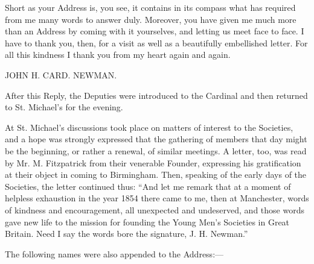 Short as your Address is, you see, it contains in its compass what
has required from me many words to answer duly. Moreover, you have
given me much more than an Address by coming with it yourselves, and
letting us meet face to face. I have to thank you, then, for a visit
as well as a beautifully embellished letter. For all this
kindness I thank you from my heart again and again.

JOHN H. CARD. NEWMAN.

After this Reply, the Deputies were introduced to the Cardinal and
then returned to St. Michael's for the evening.

At St. Michael's discussions took place on matters of interest to
the Societies, and a hope was strongly expressed that the gathering of
members that day might be the beginning, or rather a renewal, of
similar meetings. A letter, too, was read by Mr. M. Fitzpatrick from
their venerable Founder, expressing his gratification at their object
in coming to Birmingham. Then, speaking of the early days of the
Societies, the letter continued thus: ``And let me remark that at
a moment of helpless exhaustion in the year 1854 there came to me,
then at Manchester, words of kindness and encouragement, all
unexpected and undeserved, and those words gave new life to the
mission for founding the Young Men's Societies in Great Britain. Need
I say the words bore the signature, J. H. Newman.''

The following names were also appended to the Address:—

